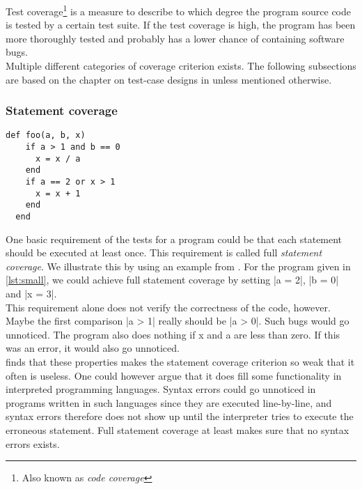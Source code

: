 \MakeShortVerb{\|}

Test coverage\footnote{Also known as \emph{code coverage}} is a measure
to describe to which degree the program source code is tested by a
certain test suite. If the test coverage is high, the program has been
more thoroughly tested and probably has a lower chance of containing
software bugs.\cite{wiki:coverage}\\

Multiple different categories of coverage criterion exists. The
following subsections are based on the chapter on test-case designs in
\citet{book:art_of_testing} unless mentioned otherwise.\\


\subsubsection{Statement coverage}

\begin{lstlisting}[caption=A small example program,
                   label=lst:small, float=t]
  def foo(a, b, x)
    if a > 1 and b == 0
      x = x / a
    end
    if a == 2 or x > 1
      x = x + 1
    end
  end
\end{lstlisting}

One basic requirement of the tests for a program could be that each
statement should be executed at least once. This requirement is called
full \emph{statement coverage}. We illustrate this by using an example
from \citet{book:art_of_testing}. For the program given in
\ref{lst:small}, we could achieve full statement coverage by setting
|a = 2|, |b = 0| and |x = 3|.\\

This requirement alone does not verify the correctness of the code,
however. Maybe the first comparison |a > 1| really should be |a > 0|.
Such bugs would go unnoticed. The program also does nothing if x and a
are less than zero. If this was an error, it would also go unnoticed.\\

\citeauthor{book:art_of_testing} finds that these properties makes the
statement coverage criterion so weak that it often is useless. One could
however argue that it does fill some functionality in interpreted
programming languages. Syntax errors could go unnoticed in programs
written in such languages since they are executed line-by-line, and
syntax errors therefore does not show up until the interpreter tries to
execute the erroneous statement. Full statement coverage at least makes
sure that no syntax errors exists.\\


